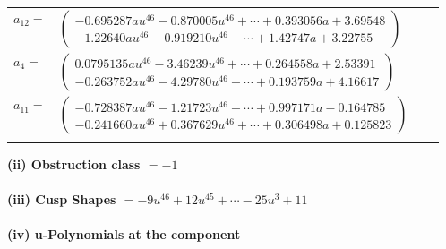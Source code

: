 \documentclass[1p]{elsarticle_modified}
\theoremstyle{definition}
\begin{document}
\begin{tabular}{m{7pt} m{180pt} m{7pt} m{180pt} }
\flushright $a_{12}=$&$\begin{pmatrix}-0.695287 a u^{46}-0.870005 u^{46}+\cdots+0.393056 a+3.69548\\-1.22640 a u^{46}-0.919210 u^{46}+\cdots+1.42747 a+3.22755\end{pmatrix}$ \\
\flushright $a_{4}=$&$\begin{pmatrix}0.0795135 a u^{46}-3.46239 u^{46}+\cdots+0.264558 a+2.53391\\-0.263752 a u^{46}-4.29780 u^{46}+\cdots+0.193759 a+4.16617\end{pmatrix}$ \\
\flushright $a_{11}=$&$\begin{pmatrix}-0.728387 a u^{46}-1.21723 u^{46}+\cdots+0.997171 a-0.164785\\-0.241660 a u^{46}+0.367629 u^{46}+\cdots+0.306498 a+0.125823\end{pmatrix}$\\&\end{tabular}
\flushleft \textbf{(ii) Obstruction class $= -1$}\\~\\
\flushleft \textbf{(iii) Cusp Shapes $= -9 u^{46}+12 u^{45}+\cdots-25 u^3+11$}\\~\\
\newpage\renewcommand{\arraystretch}{1}
\flushleft \textbf{(iv) u-Polynomials at the component}\newline \\
\end{document}
